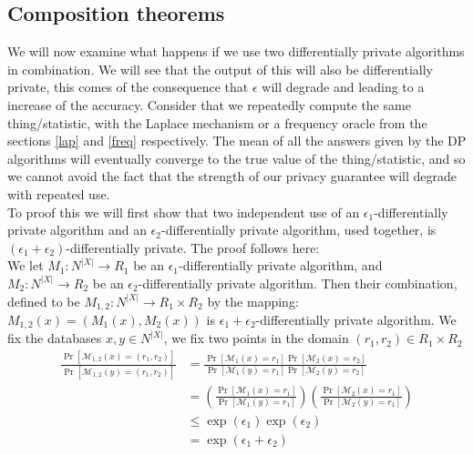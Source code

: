 \documentclass[11pt]{article}
\theoremstyle{definition}
\begin{document}
\subsection{Composition theorems}
We will now examine what happens if we use two differentially private algorithms in combination. We will see that the output of this will also be differentially private, this comes of the consequence that $\epsilon$ will degrade and leading to a increase of the accuracy. Consider that we repeatedly compute the same thing/statistic, with the Laplace mechanism or a frequency oracle from the sections \ref{lap} and \ref{freq} respectively. The mean of all the answers given by the DP algorithms will eventually converge to the true value of the thing/statistic, and so we cannot avoid the fact that the strength of our privacy guarantee will degrade with repeated use. \\ 
To proof this we will first show that two independent use of an $\epsilon_1$-differentially private algorithm and an $\epsilon_2$-differentially private algorithm, used together, is $(\epsilon_1+\epsilon_2)$-differentially private. The proof follows here: \\
We let $M_1:N^{|X|} \rightarrow R_1$ be an $\epsilon_1$-differentially private algorithm, and $M_2:N^{|X|} \rightarrow R_2$ be an $\epsilon_2$-differentially private algorithm. Then their combination, defined to be $M_{1,2}:N^{|X|}\rightarrow R_1\times R_2$ by the mapping: $M_{1,2}(x) = (M_1(x),M_2(x))$ is  $\epsilon_1+\epsilon_2$-differentially private algorithm. We fix the databases $x,y \in N^{|X|}$, we fix two points in the domain $(r_1,r_2)\in R_1\times R_2$
\begin{align*}
    \frac{\operatorname{Pr}\left[\mathcal{M}_{1,2}(x)=\left(r_{1}, r_{2}\right)\right]}{\operatorname{Pr}\left[\mathcal{M}_{1,2}(y)=\left(r_{1}, r_{2}\right)\right]} &=\frac{\operatorname{Pr}\left[\mathcal{M}_{1}(x)=r_{1}\right] \operatorname{Pr}\left[\mathcal{M}_{2}(x)=r_{2}\right]}{\operatorname{Pr}\left[\mathcal{M}_{1}(y)=r_{1}\right] \operatorname{Pr}\left[\mathcal{M}_{2}(y)=r_{2}\right]} \\
&=\left(\frac{\operatorname{Pr}\left[\mathcal{M}_{1}(x)=r_{1}\right]}{\operatorname{Pr}\left[\mathcal{M}_{1}(y)=r_{1}\right]}\right)\left(\frac{\operatorname{Pr}\left[\mathcal{M}_{2}(x)=r_{1}\right]}{\operatorname{Pr}\left[\mathcal{M}_{2}(y)=r_{1}\right]}\right) \\
& \leq \exp \left(\epsilon_{1}\right) \exp \left(\epsilon_{2}\right) \\
&=\exp \left(\epsilon_{1}+\epsilon_{2}\right)
\end{align*} \\
\end{document}

